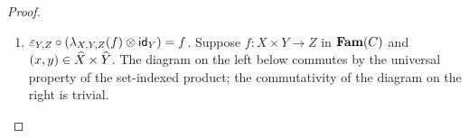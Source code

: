 \begin{proof}
\begin{enumerate}
To show $\lambda_{X,Y,Z}(f^\dagger, g^\dagger) = (f,g)$, suppose $\lambda_{X,Y,Z}(f^\dagger, g^\dagger) = (f',
g')$ with
\begin{itemize}
\item $f'(x) = (f^\dagger \comp (x, -), \reindex{g^\dagger}{(x,-)} \comp \inj_{\faml{Y}}): Y \to Z$ where
$\inj_{\faml{Y}}: \faml{Y} \to \const_{\idx{Y}}(\faml{X}_x) \biprod \faml{Y}$
\item $g'_x = \lambda_{\prod_{\idx{Y}}}(\reindex{g^\dagger}{(x,-)} \comp \inj_{\faml{X}_x}:
\const_{\idx{Y}}(\faml{X}_x) \to \reindex{\faml{Z}}{f^\dagger})$ where $\inj_{\faml{X}_x}:
\const_{\idx{Y}}(\faml{X}_x) \to \const_{\idx{Y}}(\faml{X}_x) \biprod \faml{Y}$
\end{itemize}
\noindent To show $f' = f : \idx{X} \to \Fam(C)(Y,Z)$, suppose $x \in \idx{X}$ and show $f'(x) = f(x): Y \to
Z$. Suppose $y \in \idx{Y}$.
\begin{enumerate}
\item $\idx{f'(x)}(y) = (f^\dagger \comp (x, -))(y) = f^\dagger(x,y) = \idx{f(x)}(y)$.
\item $\faml{f'(x)}_y = (\reindex{g^\dagger}{(x,-)} \comp \inj_{\faml{Y}})_y = \reindex{g^\dagger}{(x,-)}_y \comp
{\inj_{\faml{Y}}}_y = g^\dagger_{x,y} \comp {\inj_{\faml{Y}}}_y = \coprodM{{\eval_{\prod}}_y \comp
g_x}{\faml{f(x)}_y} \comp {\inj_{\faml{Y}}}_y = \faml{f(x)}_y$.
\end{enumerate}

To show $g' = g$, suppose $x \in \idx{X}$.
\begin{align*}
\small
g'_x
&=
\lambda_{\prod_{\idx{Y}}}(\reindex{g^\dagger}{(x,-)} \comp \inj_{\faml{X}_x}) \\
&=
\lambda_{\prod_{\idx{Y}}}(\{g^\dagger_{(x,y)} \comp (\inj_{\faml{X}_x})_y\}_{y \in \idx{Y}}) \\
&=
\lambda_{\prod_{\idx{Y}}}(\{\coprodM{{\eval_{\prod}}_y \comp g_x}{\faml{f(x)}_y} \comp (\inj_{\faml{X}_x})_y\}_{y \in \idx{Y}}) \\
&=
\lambda_{\prod_{\idx{Y}}}(\{{\eval_{\prod}}_y \comp g_x\}_{y \in \idx{Y}}) \\
&=
g_x
\end{align*}
\qed

\item $\varepsilon_{Y,Z} \circ (\lambda_{X,Y,Z}(f) \otimes \mathsf{id}_{Y}) = f$. Suppose $f: X \times Y \to Z$ in $\mathbf{Fam}(C)$
and $(x, y) \in \widehat{X} \times \widehat{Y}$. The diagram on the left below commutes by the universal property of
the set-indexed product; the commutativity of the diagram on the right is trivial.


\end{enumerate}
\end{proof}
